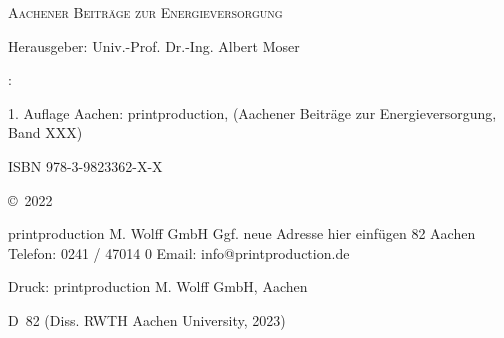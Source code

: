 \begin{titlepage}
	\singlespacing
	\newpage
	\thispagestyle{empty}
	\large{\textsc{Aachener Beiträge zur Energieversorgung}}
	\normalsize
	
	Herausgeber:
	\newline
	Univ.-Prof. Dr.-Ing. Albert Moser
	
	\vfill
	
	{\varName} {\varSurname}:
	\newline
	
	
	
	\vspace*{10mm}                                                                                                
	1. Auflage Aachen:
	\newline                                                                                           
	printproduction, 
	\newline
	(Aachener Beiträge zur Energieversorgung, Band XXX)
	\newline
	
	ISBN 978-3-9823362-X-X
	\vspace*{10mm}                                                                                             
	
	\copyright~2022 {\varName} {\varSurname}
	
	printproduction M. Wolff GmbH
	\newline
	Ggf. neue Adresse hier einfügen 82
	 Aachen
	\newline
	Telefon: 0241 / 47014 0
	\newline
	Email: info@printproduction.de
	
	Druck: printproduction M. Wolff GmbH, Aachen
	
	\glqq D~82 (Diss. RWTH Aachen University, 2023)\grqq
	
\end{titlepage}